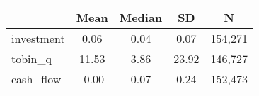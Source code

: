 {
\def\sym#1{\ifmmode^{#1}\else\(^{#1}\)\fi}
\begin{tabular}{l*{1}{cccc}}
\hline\hline
                    &        Mean&      Median&          SD&           N\\
\hline
investment          &        0.06&        0.04&        0.07&     154,271\\
tobin\_q             &       11.53&        3.86&       23.92&     146,727\\
cash\_flow           &       -0.00&        0.07&        0.24&     152,473\\
\hline\hline
\end{tabular}
}

